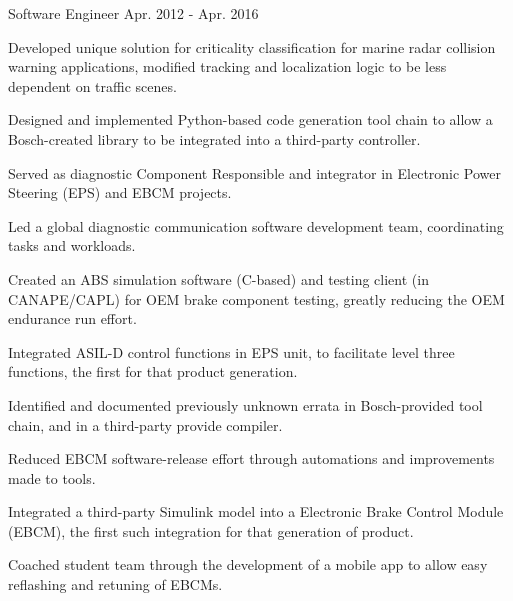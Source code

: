 \begin{cventries}
  \cventry
    {Software Engineer} %
    {} %
    {} %
    {Apr. 2012 - Apr. 2016} %
    {
      \begin{cvitems} %
        \item {Developed unique solution for criticality classification for marine radar collision warning applications, modified tracking and localization logic to be less dependent on traffic scenes.}
        \item {Designed and implemented Python-based code generation tool chain to allow a Bosch-created library to be integrated into a third-party controller.}
        \item {Served as diagnostic Component Responsible and integrator in Electronic Power Steering (EPS) and EBCM projects.}
        \item {Led a global diagnostic communication software development team, coordinating tasks and workloads.}
        \iflongform     
        \item {Created an ABS simulation software (C-based) and testing client (in CANAPE/CAPL) for OEM brake component testing, greatly reducing the OEM endurance run effort.}
        \item {Integrated ASIL-D control functions in EPS unit, to facilitate level three functions, the first for that product generation.}
        \item {Identified and documented previously unknown errata in Bosch-provided tool chain, and in a third-party provide compiler.}
        \item {Reduced EBCM software-release effort through automations and improvements made to tools.}
        \item {Integrated a third-party Simulink model into a Electronic Brake Control Module (EBCM), the first such integration for that generation of product.}
        \item {Coached student team through the development of a mobile app to allow easy reflashing and retuning of EBCMs.}
        \fi
      \end{cvitems}
    }
\end{cventries}
